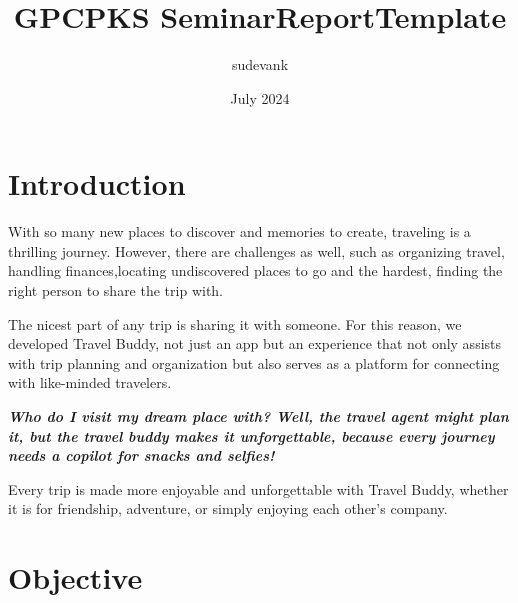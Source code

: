 \documentclass[12pt,a4paper]{report}
\title{GPCPKS SeminarReportTemplate}
\author{sudevank }
\date{July 2024}
\begin{document}
\gdef \title{How to prepare a Seminar report using \LaTeX } %
\gdef \author{Student Name}	 %
\gdef \dept{Electronics  Engineering} %
\gdef \degree{Diploma } %
\gdef \branch{Electronics  Engineering} %
\gdef \college{Government Polytechnic College}
\gdef \collegeplace{Palakkad}
\gdef \rollno{TVE17EC0XY} %
\gdef \deptabbr{Dept.of Electronics} %
\gdef \guide{Lecture-1}
\gdef \hod{Dr. Dileep P} %
\gdef \hoddes{Professor and Head} %

\gdef \acadyear{2024 - 25} %
\gdef \month{November 2024} %
\gdef \date{21-11-2020} %
\setcounter{secnumdepth}{1} 


%
 



\thispagestyle{empty}
\newpage
\tableofcontents
\listoffigures

\cleardoublepage
\setcounter{page}{1}
\chapter{ Introduction}
With so many new places to discover and memories to create, traveling is a thrilling journey. However, there are challenges as well, such as organizing travel, handling finances,locating undiscovered places to go and the hardest, finding the right person to share the trip with. 

The nicest part of any trip is sharing it with someone. For this reason, we developed Travel Buddy, not just an app but an experience that not only assists with trip planning and organization but also serves as a platform for connecting with like-minded travelers.

\textbf{\textit{Who do I visit my dream place with? Well, the travel agent might plan it, but the travel buddy makes it unforgettable, because every journey needs a copilot for snacks and selfies!}}

Every trip is made more enjoyable and unforgettable with Travel Buddy, whether it is for friendship, adventure, or simply enjoying each other's company.

\chapter{Objective}
\end{document}
